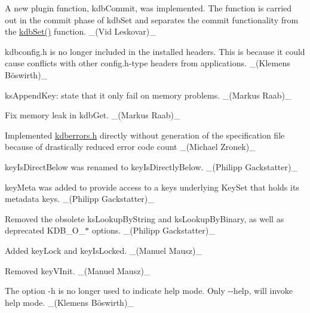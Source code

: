 \begin{DoxyItemize}
\item A new plugin function, {\ttfamily kdb\+Commit}, was implemented. The function is carried out in the {\ttfamily commit} phase of {\ttfamily kdb\+Set} and separates the commit functionality from the {\ttfamily \hyperlink{group__kdb_ga11436b058408f83d303ca5e996832bcf}{kdb\+Set()}} function. \+\_\+(\+Vid Leskovar)\+\_\+
\item {\ttfamily kdbconfig.\+h} is no longer included in the installed headers. This is because it could cause conflicts with other {\ttfamily config.\+h}-\/type headers from applications. \+\_\+(Klemens Böswirth)\+\_\+
\item {\ttfamily ks\+Append\+Key}\+: state that it only fail on memory problems. \+\_\+(\+Markus Raab)\+\_\+
\item Fix memory leak in {\ttfamily kdb\+Get}. \+\_\+(\+Markus Raab)\+\_\+
\item Implemented {\ttfamily \hyperlink{kdberrors_8h}{kdberrors.\+h}} directly without generation of the {\ttfamily specification} file because of drastically reduced error code count \+\_\+(\+Michael Zronek)\+\_\+
\item {\ttfamily key\+Is\+Direct\+Below} was renamed to {\ttfamily key\+Is\+Directly\+Below}. \+\_\+(\+Philipp Gackstatter)\+\_\+
\item {\ttfamily key\+Meta} was added to provide access to a key\textquotesingle{}s underlying Key\+Set that holds its metadata keys. \+\_\+(\+Philipp Gackstatter)\+\_\+
\item Removed the obsolete {\ttfamily ks\+Lookup\+By\+String} and {\ttfamily ks\+Lookup\+By\+Binary}, as well as deprecated {\ttfamily K\+D\+B\+\_\+\+O\+\_\+$\ast$} options. \+\_\+(\+Philipp Gackstatter)\+\_\+
\item Added {\ttfamily key\+Lock} and {\ttfamily key\+Is\+Locked}. \+\_\+(\+Manuel Mausz)\+\_\+
\item Removed {\ttfamily key\+V\+Init}. \+\_\+(\+Manuel Mausz)\+\_\+
\end{DoxyItemize}


\begin{DoxyItemize}
\item The option {\ttfamily -\/h} is no longer used to indicate help mode. Only {\ttfamily -\/-\/help}, will invoke help mode. \+\_\+(Klemens Böswirth)\+\_\+
\end{DoxyItemize}



